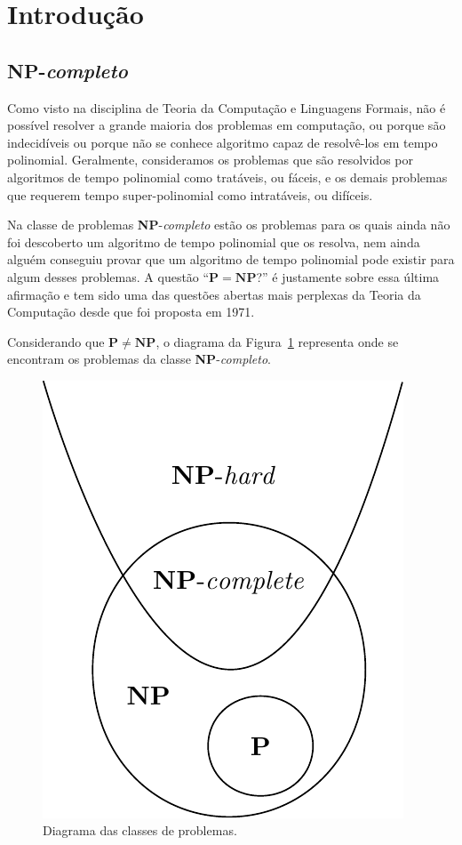 \section{Introdução \label{sec:introducao}}

\subsection{\textbf{NP}-\textit{completo}}

Como visto na disciplina de Teoria da Computação e Linguagens Formais, não é possível resolver a grande maioria dos problemas em computação, ou porque são indecidíveis ou porque não se conhece algoritmo capaz de resolvê-los em tempo polinomial. Geralmente, consideramos os problemas que são resolvidos por algoritmos de tempo polinomial como tratáveis, ou fáceis, e os demais problemas que requerem tempo super-polinomial como intratáveis, ou difíceis.

Na classe de problemas \textbf{NP}-\textit{completo} estão os problemas para os quais ainda não foi descoberto um algoritmo de tempo polinomial que os resolva, nem ainda alguém conseguiu provar que um algoritmo de tempo polinomial pode existir para algum desses problemas. A questão ``$\mathbf{P} = \mathbf{NP}$?'' é justamente sobre essa última afirmação e tem sido uma das questões abertas mais perplexas da Teoria da Computação desde que foi proposta em 1971.

Considerando que $\mathbf{P} \neq \mathbf{NP}$, o diagrama da Figura~\ref{fig:np} representa onde se encontram os problemas da classe \textbf{NP}-\textit{completo}.

\begin{figure}[h]
	\centering
	\includegraphics[scale=0.8]{./input/np.pdf}
	\caption{Diagrama das classes de problemas. \label{fig:np}}
\end{figure}

